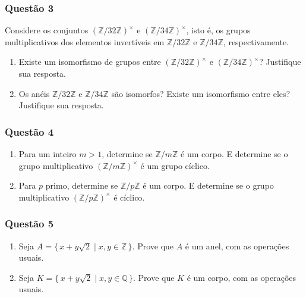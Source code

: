        \subsubsection*{Questão 3}

        Considere os conjuntos $(\mathbb{Z}/32\mathbb{Z})^\times$ e $(\mathbb{Z}/34\mathbb{Z})^\times$, isto é, os grupos multiplicativos dos elementos invertíveis em $\mathbb{Z}/32\mathbb{Z}$ e $\mathbb{Z}/34\mathbb{Z}$, respectivamente.

        \begin{enumerate}[label=\alph*), left=0.5cm, align=left, nosep]
            \item Existe um isomorfismo de grupos entre $(\mathbb{Z}/32\mathbb{Z})^\times$ e $(\mathbb{Z}/34\mathbb{Z})^\times$? Justifique sua resposta.
            \item Os anéis $\mathbb{Z}/32\mathbb{Z}$ e $\mathbb{Z}/34\mathbb{Z}$ são isomorfos? Existe um isomorfismo entre eles? Justifique sua resposta.
        \end{enumerate}

        \subsubsection*{Questão 4}

        \begin{enumerate}[label=\alph*), left=0.5cm, align=left, nosep]
            \item Para um inteiro $m > 1$, determine se $\mathbb{Z}/m\mathbb{Z}$ é um corpo. E determine se o grupo multiplicativo $(\mathbb{Z}/m\mathbb{Z})^{\times}$ é um grupo cíclico.
            \item Para $p$ primo, determine se $\mathbb{Z}/p\mathbb{Z}$ é um corpo. E determine se o grupo multiplicativo $(\mathbb{Z}/p\mathbb{Z})^{\times}$ é cíclico.
        \end{enumerate}

        \subsubsection*{Questão 5}

        \begin{enumerate}[label=\alph*), left=0.5cm, align=left, nosep]
            \item Seja $A = \{\, x + y \sqrt{2} \mid x, y \in \mathbb{Z} \,\}$. Prove que $A$ é um anel, com as operações usuais.
            \item Seja $K = \{\, x + y \sqrt{2} \mid x, y \in \mathbb{Q} \,\}$. Prove que $K$ é um corpo, com as operações usuais.
        \end{enumerate}

